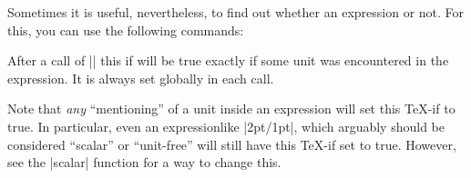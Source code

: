 Sometimes it is useful, nevertheless, to find out whether an expression or not.
For this, you can use the following commands:

{\let\ifpgfmathunitsdeclared\relax
  \begin{command}{\ifpgfmathunitsdeclared}
    After a call  of |\pgfmathparse| this if will be true exactly if
    some unit was encountered in the expression. It is always set
    globally in each call.

    Note that \emph{any} ``mentioning'' of a unit inside an
    expression will set this \TeX-if to true. In particular, even an
    expressionlike |2pt/1pt|, which arguably should be considered
    ``scalar'' or ``unit-free'' will still have this \TeX-if set to
    true. However, see the |scalar| function for a way to change
    this.
  \end{command}
}

